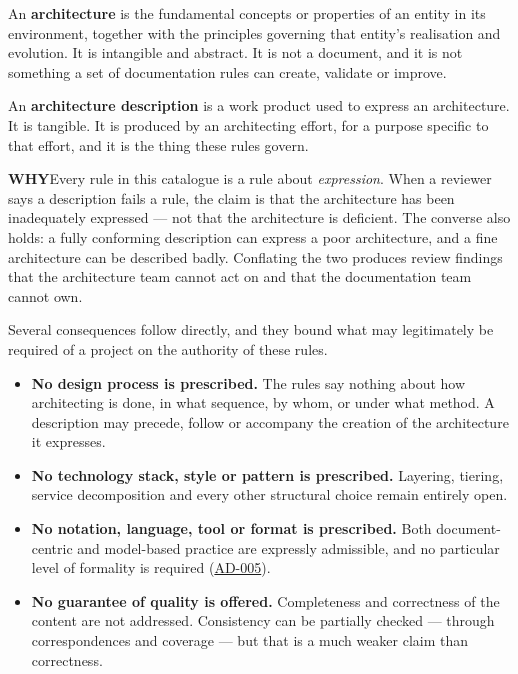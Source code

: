 \documentclass[11pt,a4paper]{report}
\newcommand{\calloutlead}[2]{{\sffamily\bfseries\footnotesize\color{#1}#2\quad}}
\newcommand{\why}[1]{\begin{whybox}\calloutlead{navy}{WHY}#1\end{whybox}}
\newcommand{\rref}[1]{\hyperref[rule:#1]{\textsf{\small #1}}}
\begin{document}
An \textbf{architecture} is the fundamental concepts or properties of an entity
in its environment, together with the principles governing that entity's
realisation and evolution. It is intangible and abstract. It is not a document,
and it is not something a set of documentation rules can create, validate or
improve.

An \textbf{architecture description} is a work product used to express an
architecture. It is tangible. It is produced by an architecting effort, for a
purpose specific to that effort, and it is the thing these rules govern.

\why{Every rule in this catalogue is a rule about \emph{expression}. When a
reviewer says a description fails a rule, the claim is that the architecture has
been inadequately expressed --- not that the architecture is deficient. The
converse also holds: a fully conforming description can express a poor
architecture, and a fine architecture can be described badly. Conflating the two
produces review findings that the architecture team cannot act on and that the
documentation team cannot own.}

Several consequences follow directly, and they bound what may legitimately be
required of a project on the authority of these rules.

\begin{itemize}
  \item \textbf{No design process is prescribed.} The rules say nothing about
        how architecting is done, in what sequence, by whom, or under what
        method. A description may precede, follow or accompany the creation of
        the architecture it expresses.
  \item \textbf{No technology stack, style or pattern is prescribed.} Layering,
        tiering, service decomposition and every other structural choice remain
        entirely open.
  \item \textbf{No notation, language, tool or format is prescribed.} Both
        document-centric and model-based practice are expressly admissible, and
        no particular level of formality is required
        (\rref{AD-005}).
  \item \textbf{No guarantee of quality is offered.} Completeness and
        correctness of the content are not addressed. Consistency can be
        partially checked --- through correspondences and coverage --- but that
        is a much weaker claim than correctness.
\end{itemize}
\end{document}
